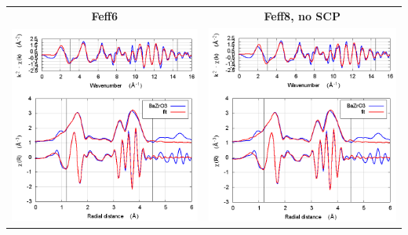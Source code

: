\documentclass[11pt]{article}
\begin{document}
\begin{center}
  \begin{tabular}{cc}
    \textbf{Feff6} & \textbf{Feff8, no SCP} \\ 
    \includegraphics[width=.45\linewidth]{BaZrO3/scf/fit_feff6.png} & 
    \includegraphics[width=.45\linewidth]{BaZrO3/scf/fit_noSCF.png} \\ 
  \end{tabular}
\end{center}
\end{document}
